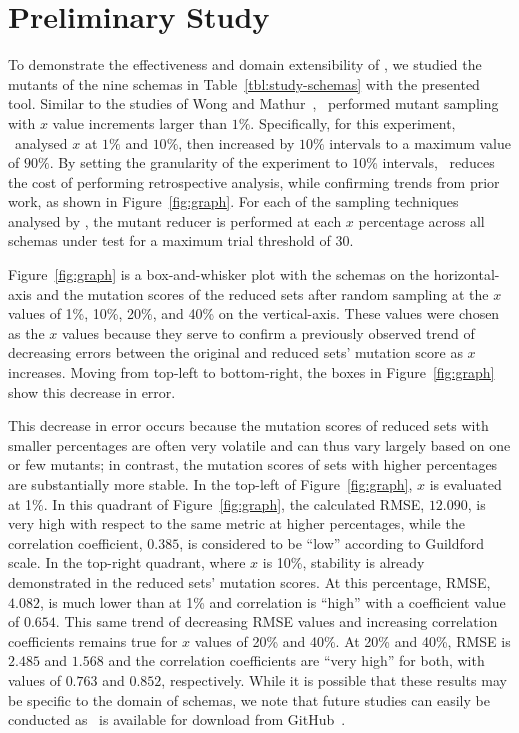 \vspace*{-.25em}

\section{Preliminary Study}


To demonstrate the effectiveness and domain extensibility of \mrstudyr, we studied the mutants of the nine schemas in
Table~\ref{tbl:study-schemas} with the presented tool. Similar to the studies of Wong and Mathur~\cite{mathur1994empirical},
\mr~performed mutant sampling with $x$ value increments larger than $1\%$. Specifically, for this experiment, \mr~analysed
$x$ at $1\%$ and $10\%$, then increased by $10\%$ intervals to a maximum value of $90\%$. By setting the granularity of the
experiment to $10\%$ intervals, \mr~reduces the cost of performing retrospective analysis, while confirming trends from prior
work, as shown in Figure~\ref{fig:graph}. For each of the sampling techniques analysed by \mr, the mutant reducer is performed
at each $x$ percentage across all schemas under test for a maximum trial threshold of 30.

Figure~\ref{fig:graph} is a box-and-whisker plot with the schemas on the horizontal-axis and the mutation scores of the reduced
sets after random sampling at the $x$ values of 1\%, 10\%, 20\%, and 40\% on the vertical-axis.  These values were chosen as the
$x$ values because they serve to confirm a previously observed trend of decreasing errors between the original and reduced sets'
mutation score as $x$ increases. Moving from top-left to bottom-right, the boxes in Figure~\ref{fig:graph} show this decrease in
error.


This decrease in error occurs because the mutation scores of reduced sets with smaller percentages are often very volatile and can
thus vary largely based on one or few mutants; in contrast, the mutation scores of sets with higher percentages are substantially
more stable. In the top-left of Figure~\ref{fig:graph}, $x$ is evaluated at 1\%.  In this quadrant of Figure~\ref{fig:graph}, the
calculated RMSE, $12.090$, is very high with respect to the same metric at higher percentages, while the correlation coefficient,
$0.385$, is considered to be ``low'' according to Guildford scale. In the top-right quadrant, where
$x$ is 10\%, stability is already demonstrated in the reduced sets' mutation scores. At this percentage, RMSE, $4.082$, is much lower
than at 1\% and correlation is ``high'' with a coefficient value of $0.654$. This same trend of decreasing RMSE values and increasing
correlation coefficients remains true for $x$ values of 20\% and 40\%. At 20\% and 40\%, RMSE is $2.485$ and $1.568$ and the correlation
coefficients are ``very high'' for both, with values of $0.763$ and $0.852$, respectively. While it is possible that these results may
be specific to the domain of schemas, we note that future studies can easily be conducted as \mr~is available for download from
GitHub~\cite{tool}.


